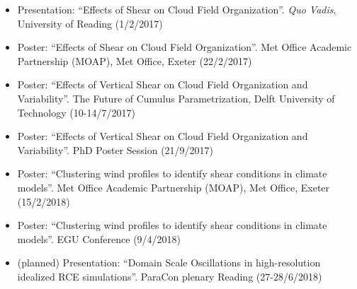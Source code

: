 \documentclass[11pt,a4paper]{article}
\begin{document}
\begin{itemize}
  \item Presentation: ``Effects of Shear on Cloud Field Organization''. \textit{Quo Vadis}, University of Reading (1/2/2017)
  \item Poster: ``Effects of Shear on Cloud Field Organization''. Met Office Academic Partnership (MOAP), Met Office, Exeter (22/2/2017)
  \item Poster: ``Effects of Vertical Shear on Cloud Field Organization and Variability''. The Future of Cumulus Parametrization, Delft University of Technology (10-14/7/2017)
  \item Poster: ``Effects of Vertical Shear on Cloud Field Organization and Variability''. PhD Poster Session (21/9/2017)
  \item Poster: ``Clustering wind profiles to identify shear conditions in climate models''. Met Office Academic Partnership (MOAP), Met Office, Exeter (15/2/2018)
  \item Poster: ``Clustering wind profiles to identify shear conditions in climate models''. EGU Conference (9/4/2018)
  \item (planned) Presentation: ``Domain Scale Oscillations in high-resolution idealized RCE simulations''. ParaCon plenary Reading (27-28/6/2018)
\end{itemize}
\end{document}
